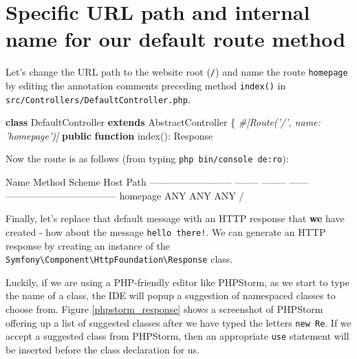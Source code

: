 \documentclass[a4paperpaper,openright]{book}
\newenvironment{Shaded}{}{}
\newcommand{\CommentTok}[1]{\textcolor[rgb]{0.38,0.63,0.69}{\textit{#1}}}
\newcommand{\ExtensionTok}[1]{#1}
\newcommand{\KeywordTok}[1]{\textcolor[rgb]{0.00,0.44,0.13}{\textbf{#1}}}
\newcommand{\NormalTok}[1]{#1}
\newcommand{\OtherTok}[1]{\textcolor[rgb]{0.00,0.44,0.13}{#1}}
\begin{document}
\hypertarget{specific-url-path-and-internal-name-for-our-default-route-method}{%
\section{Specific URL path and internal name for our default route
method}\label{specific-url-path-and-internal-name-for-our-default-route-method}}

Let's change the URL path to the website root (\texttt{/}) and name the
route \texttt{homepage} by editing the annotation comments preceding
method \texttt{index()} in
\texttt{src/Controllers/DefaultController.php}.

\begin{Shaded}
\begin{Highlighting}[]
    \KeywordTok{class}\NormalTok{ DefaultController }\KeywordTok{extends}\NormalTok{ AbstractController}
\NormalTok{    \{}
        \CommentTok{#[Route('/', name: 'homepage')]}
        \KeywordTok{public} \KeywordTok{function}\NormalTok{ index}\OtherTok{()}\NormalTok{: Response}
\end{Highlighting}
\end{Shaded}

Now the route is as follows (from typing
\texttt{php\ bin/console\ de:ro}):

\begin{Shaded}
\begin{Highlighting}[]
  \ExtensionTok{Name}\NormalTok{                       Method   Scheme   Host   Path}
 \ExtensionTok{--------------------------}\NormalTok{ -------- -------- ------ -----------------------------------}
  \ExtensionTok{homepage}\NormalTok{                   ANY      ANY      ANY    /}
\end{Highlighting}
\end{Shaded}

Finally, let's replace that default message with an HTTP response that
\textbf{we} have created - how about the message \texttt{hello\ there!}.
We can generate an HTTP response by creating an instance of the
\texttt{Symfony\textbackslash{}Component\textbackslash{}HttpFoundation\textbackslash{}Response}
class.

Luckily, if we are using a PHP-friendly editor like PHPStorm, as we
start to type the name of a class, the IDE will popup a suggestion of
namespaced classes to choose from. Figure \ref{phpstorm_response} shows
a screenshot of PHPStorm offering up a list of suggested classes after
we have typed the letters \texttt{new\ Re}. If we accept a suggested
class from PHPStorm, then an appropriate \texttt{use} statement will be
inserted before the class declaration for us.
\end{document}
